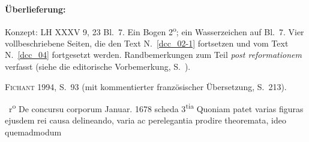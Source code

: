 %
%
%
%
%
\frenchspacing%
%
\begin{ledgroupsized}[r]{120mm}%
\footnotesize%
\pstart%
\noindent\textbf{Überlieferung:}%
\pend%
\end{ledgroupsized}%
\begin{ledgroupsized}[r]{114mm}%
\footnotesize%
\pstart \parindent -6mm%
%
Konzept: LH XXXV 9, 23 Bl.~7.
Ein Bogen 2\textsuperscript{o};
ein Wasserzeichen auf Bl.~7.
Vier vollbeschriebene Seiten,
die den Text N.~\ref{dcc_02-1} %
fortsetzen und vom Text N.~\ref{dcc_04} %
fortgesetzt werden.
Randbemerkungen zum Teil \textit{post reformationem} verfasst (siehe die editorische Vorbemerkung, S.~).
\pend%
\end{ledgroupsized}%
%
\begin{ledgroupsized}[r]{114mm}%
\footnotesize%
\pstart \parindent -6mm%
%
\textsc{Fichant}\cite{01056} 1994, S.~93 (mit kommentierter französischer Übersetzung, S.~213).
\pend%
\end{ledgroupsized}%
%
%
\frenchspacing%
%
%
\vspace{8mm}%
\normalsize%
\count{}%
\count{}%
\count{}%
\pstart%
\noindent%
%
~r\textsuperscript{o}\rbrack%
\hspace{41mm}
De concursu corporum%
\protect{}%
\hspace{30mm}%
Januar. 1678%
\pend%
%
\pstart%
\noindent%
\centering%
scheda 3\textsuperscript{tia}%
\protect{}
\pend%
\vspace{0.5em}
%
\pstart%
\noindent%
Quoniam patet
varias figuras%
\protect{}
ejusdem rei causa delineando,
varia ac perelegantia prodire theoremata,%
\protect{}
ideo quemadmodum
%
